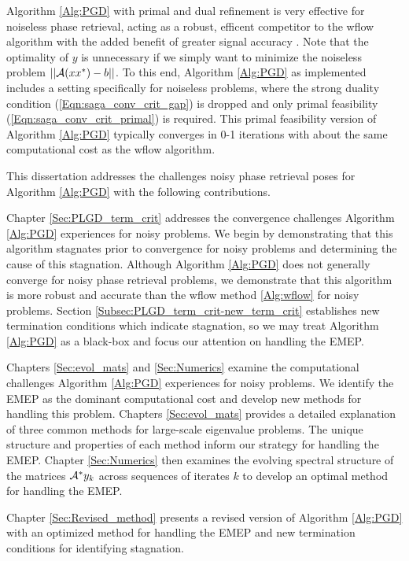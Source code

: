 \begin{enumerate}
Algorithm \ref{Alg:PGD} with primal and dual refinement is very effective for noiseless phase retrieval, acting as a robust, efficent competitor to the wflow algorithm with the added benefit of greater signal accuracy \cite[Section 5.1.1, 5.1.3]{DBLP:journals/siamsc/FriedlanderM16}.  Note that the optimality of $y$ is unnecessary if we simply want to minimize the noiseless problem $||{\mathcal A}(xx^*) - b||$.  To this end, Algorithm \ref{Alg:PGD} as implemented includes a setting specifically for noiseless problems, where the strong duality condition (\ref{Eqn:saga_conv_crit_gap}) is dropped and only primal feasibility (\ref{Eqn:saga_conv_crit_primal}) is required.  This primal feasibility version of Algorithm \ref{Alg:PGD} typically converges in 0-1 iterations with about the same computational cost as the wflow algorithm.  




\end{enumerate}









This dissertation addresses the challenges noisy phase retrieval poses for Algorithm \ref{Alg:PGD} with the following contributions.


Chapter \ref{Sec:PLGD_term_crit} addresses the convergence challenges Algorithm \ref{Alg:PGD} experiences for noisy problems.  We begin by demonstrating that this algorithm stagnates prior to convergence for noisy problems and determining the cause of this stagnation.  Although Algorithm \ref{Alg:PGD} does not generally converge for noisy phase retrieval problems, we demonstrate that this algorithm is more robust and accurate than the wflow method \ref{Alg:wflow} for noisy problems.  Section \ref{Subsec:PLGD_term_crit-new_term_crit} establishes new termination conditions which indicate stagnation, so we may treat Algorithm \ref{Alg:PGD} as a black-box and focus our attention on handling the EMEP.


Chapters \ref{Sec:evol_mats} and \ref{Sec:Numerics} examine the computational challenges Algorithm \ref{Alg:PGD} experiences for noisy problems.  We identify the EMEP as the dominant computational cost and develop new methods for handling this problem.  Chapters \ref{Sec:evol_mats} provides a detailed explanation of three common methods for large-scale eigenvalue problems.  The unique structure and properties of each method inform our strategy for handling the EMEP.  Chapter \ref{Sec:Numerics} then examines the evolving spectral structure of the matrices ${\mathcal A}^*y_k$ across sequences of iterates $k$ to develop an optimal method for handling the EMEP.

Chapter \ref{Sec:Revised_method} presents a revised version of Algorithm \ref{Alg:PGD} with an optimized method for handling the EMEP and new termination conditions for identifying stagnation.

